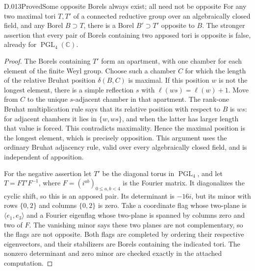\begin{saresult}{D.013}{Proved}{Some opposite Borels always exist; all need not be opposite}
For any two maximal tori $T,T'$ of a connected reductive group over
an algebraically closed field, and any Borel $B\supset T$, there is
a Borel $B'\supset T'$ opposite to $B$.  The stronger assertion
that every pair of Borels containing two apposed tori is opposite
is false, already for $\operatorname{PGL}_4(\mathbb C)$.
\end{saresult}
\begin{proof}
The Borels containing $T'$ form an apartment, with one chamber for
each element of the finite Weyl group.  Choose such a chamber $C$
for which the length of the relative Bruhat position $\delta(B,C)$
is maximal.  If this position $w$ is not the longest element,
there is a simple reflection $s$ with $\ell(ws)=\ell(w)+1$.
Move from $C$ to the unique $s$-adjacent chamber in that apartment.
The rank-one Bruhat multiplication rule says that its relative
position with respect to $B$ is $ws$: for adjacent chambers it
lies in $\{w,ws\}$, and when the latter has larger length that
value is forced.  This contradicts maximality.  Hence the maximal
position is the longest element, which is precisely opposition.
This argument uses the ordinary Bruhat adjacency rule, valid over
every algebraically closed field, and is independent of apposition.

For the negative assertion let $T'$ be the diagonal torus in
$\operatorname{PGL}_4$, and let $T=F T'F^{-1}$, where
$F=(i^{ab})_{0\le a,b<4}$ is the Fourier matrix.  It diagonalizes
the cyclic shift, so this is an apposed pair.  Its determinant is
$-16i$, but its minor with rows $\{0,2\}$ and columns $\{0,2\}$
is zero.  Take a coordinate flag whose two-plane is
$\langle e_1,e_3\rangle$ and a Fourier eigenflag whose two-plane
is spanned by columns zero and two of $F$.  The vanishing minor
says these two planes are not complementary, so the flags are
not opposite.  Both flags are completed by ordering their
respective eigenvectors, and their stabilizers are Borels
containing the indicated tori.  The nonzero determinant and zero
minor are checked exactly in the attached computation.
\end{proof}

